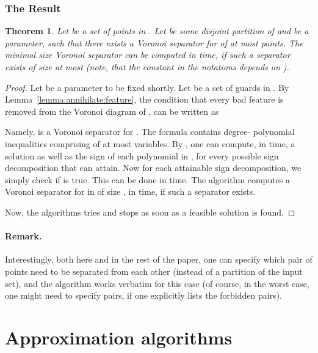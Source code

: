\InSubmitVer{\documentclass[11pt]{article}}
\numberwithin{figure}{section}
\numberwithin{table}{section}
\numberwithin{equation}{section}
\newtheorem{theorem}{Theorem}[section] \newtheorem{lemma}[theorem]{Lemma}
\newcommand{\lemref}[1]{Lemma~\ref{lemma:#1}}
\newcommand{\thmlab}[1]{\label{theorem:#1}}
\begin{document}
\subsubsection{The Result}

\begin{theorem}
    \thmlab{exact}Let  be a set of  points in . Let
     be some disjoint partition of 
    and  be a parameter, such that there exists a Voronoi
    separator for  of at most 
    points. The minimal size Voronoi separator can be computed in
     time, if such a separator exists of size
    at most  (note, that the constant in the  notations
    depends on ).
\end{theorem}

\begin{proof}
    Let  be a parameter to be fixed shortly. Let  be
    a set of  guards in .  By
    \lemref{annihilate:feature}, the condition 
    that every bad feature is removed from the Voronoi diagram of
    , can be written as
    
    Namely,  is a Voronoi separator for
    .
The formula  contains 
    degree- polynomial inequalities comprising of at most  variables. By \cite[Theorem~13.12]{bpr-arag-06}, one can
    compute, in  time, a solution as well as the
    sign of each polynomial in , for every possible sign
    decomposition that  can attain. Now for each attainable sign
    decomposition, we simply check if  is
    true. This can be done in  time. The algorithm
    computes a Voronoi separator for  in
     of size , in  time, if
    such a separator exists.
    
    Now, the algorithms tries  and
    stops as soon as a feasible solution is found.
\end{proof}



\paragraph{Remark.}

Interestingly, both here and in the rest of the paper, one can specify
which pair of points need to be separated from each other (instead of
a partition of the input set), and the algorithm works verbatim for
this case (of course, in the worst case, one might need to specify
 pairs, if one explicitly lists the forbidden pairs).



\section{Approximation algorithms}
\end{document}
